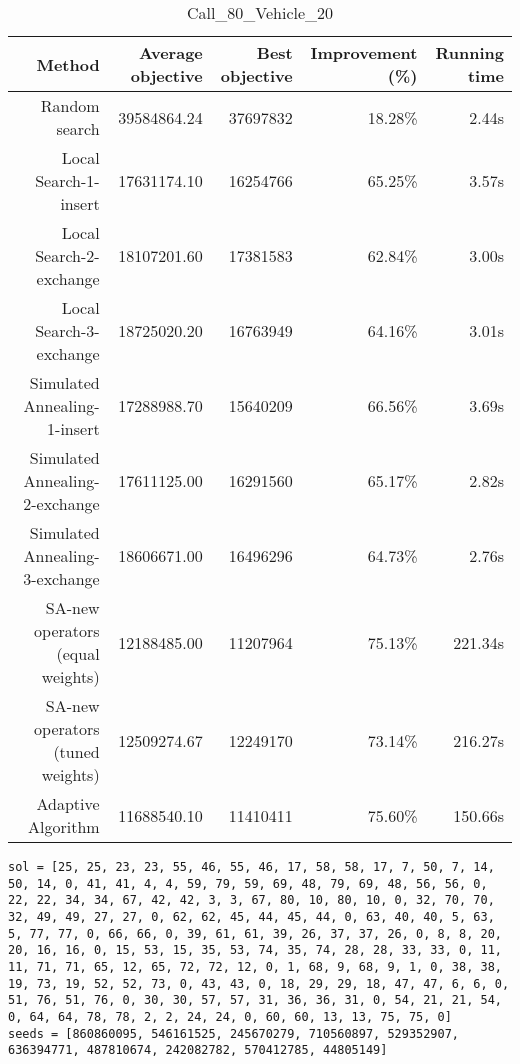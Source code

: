 \begin{table}[ht]
\centering
\caption{Call\_80\_Vehicle\_20}
\label{tab:call80vehicle20}
\begin{tabular}{|r|r|r|r|r|}
Method & Average objective & Best objective & Improvement (\%) & Running time \\
\hline
Random search & 39584864.24 & 37697832 & 18.28\% & 2.44s\\
Local Search-1-insert & 17631174.10 & 16254766 & 65.25\% & 3.57s\\
Local Search-2-exchange & 18107201.60 & 17381583 & 62.84\% & 3.00s\\
Local Search-3-exchange & 18725020.20 & 16763949 & 64.16\% & 3.01s\\
Simulated Annealing-1-insert & 17288988.70 & 15640209 & 66.56\% & 3.69s\\
Simulated Annealing-2-exchange & 17611125.00 & 16291560 & 65.17\% & 2.82s\\
Simulated Annealing-3-exchange & 18606671.00 & 16496296 & 64.73\% & 2.76s\\
SA-new operators (equal weights) & 12188485.00 & 11207964 & 75.13\% & 221.34s\\
SA-new operators (tuned weights) & 12509274.67 & 12249170 & 73.14\% & 216.27s\\
Adaptive Algorithm & 11688540.10 & 11410411 & 75.60\% & 150.66s\\
\end{tabular}%
\end{table}
\begin{lstlisting}[label={lst:call80vehicle20},caption=Optimal solution call\_80\_vehicle\_20]
sol = [25, 25, 23, 23, 55, 46, 55, 46, 17, 58, 58, 17, 7, 50, 7, 14, 50, 14, 0, 41, 41, 4, 4, 59, 79, 59, 69, 48, 79, 69, 48, 56, 56, 0, 22, 22, 34, 34, 67, 42, 42, 3, 3, 67, 80, 10, 80, 10, 0, 32, 70, 70, 32, 49, 49, 27, 27, 0, 62, 62, 45, 44, 45, 44, 0, 63, 40, 40, 5, 63, 5, 77, 77, 0, 66, 66, 0, 39, 61, 61, 39, 26, 37, 37, 26, 0, 8, 8, 20, 20, 16, 16, 0, 15, 53, 15, 35, 53, 74, 35, 74, 28, 28, 33, 33, 0, 11, 11, 71, 71, 65, 12, 65, 72, 72, 12, 0, 1, 68, 9, 68, 9, 1, 0, 38, 38, 19, 73, 19, 52, 52, 73, 0, 43, 43, 0, 18, 29, 29, 18, 47, 47, 6, 6, 0, 51, 76, 51, 76, 0, 30, 30, 57, 57, 31, 36, 36, 31, 0, 54, 21, 21, 54, 0, 64, 64, 78, 78, 2, 2, 24, 24, 0, 60, 60, 13, 13, 75, 75, 0]
seeds = [860860095, 546161525, 245670279, 710560897, 529352907, 636394771, 487810674, 242082782, 570412785, 44805149]
\end{lstlisting}%
\clearpage


